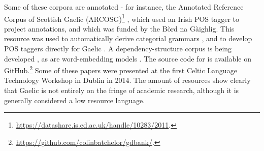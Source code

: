Some of these corpora are annotated - for instance, the Annotated Reference Corpus of Scottish Gaelic (ARCOSG)\footnote{\href{https://datashare.is.ed.ac.uk/handle/10283/2011}{https://datashare.is.ed.ac.uk/handle/10283/2011}. } \citep{ARCOSG2016, lamb2014scottish}, which used an Irish POS tagger \citep{ui2006part} to project annotations, and which was funded by the B\`ord na G\`aighlig. This resource was used to automatically derive categorial grammars \citep{batchelor2016automatic}, and to develop POS taggers directly for Gaelic \citep{lamb2014developing}. A dependency-structure corpus is being developed \citep{batchelor2014gdbank}, as are word-embedding models \citep{lamb2016developing}. The source code for \citet{batchelor2014gdbank, batchelor2016automatic} is available on GitHub.\footnote{\href{https://github.com/colinbatchelor/gdbank/}{https://github.com/colinbatchelor/gdbank/}. } Some of these papers were presented at the first Celtic Language Technology Workshop in Dublin in 2014. The amount of resources show clearly that Gaelic is not entirely on the fringe of academic research, although it is generally considered a low resource language.

